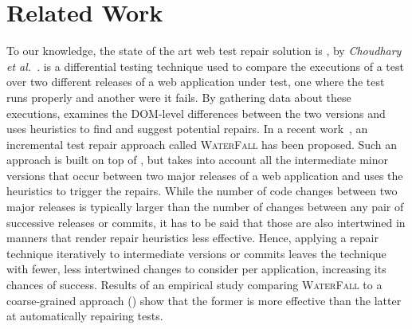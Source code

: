 \section{Related Work}\label{sec:relwork}


 To our knowledge, the state of the art web test repair solution is \water, by \textit{Choudhary et al.}~\cite{Choudhary:2011:WWA:2002931.2002935}. \water is a differential testing technique used to compare the executions of a test over two different releases of a web application under test, one where the test runs properly and another were it fails. By gathering data about these executions, \water examines the DOM-level differences between the two versions and uses heuristics to find and suggest potential repairs.
%
In a recent work~\cite{Hammoudi-2016-FSE}, an incremental test repair approach called \textsc{WaterFall} has been proposed. 
Such an approach is built on top of \water, but takes into account all the intermediate minor versions that occur between two major releases of a web application and uses the \water heuristics to trigger the repairs. While the number of code changes between two major releases is typically larger than the number of changes between any pair of successive releases or commits, it has to be said that those are also intertwined in manners that render repair heuristics less effective. Hence, applying a repair technique iteratively to intermediate versions or commits leaves the technique with fewer, less intertwined changes to consider per application, increasing its chances of success.
Results of an empirical study comparing \textsc{WaterFall} to a coarse-grained approach (\water) show that the former is more effective than the latter at automatically repairing tests.

